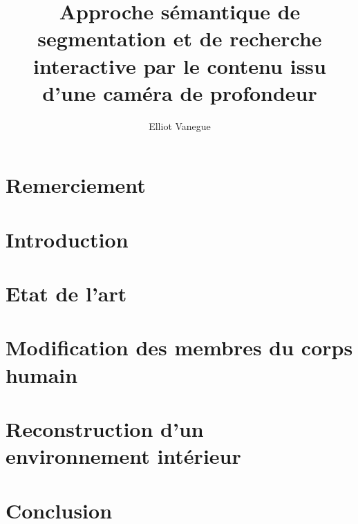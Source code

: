 \documentclass[a4paper,11pt]{article}
\title{Approche sémantique de segmentation et de recherche interactive par le contenu issu d’une caméra de profondeur}
\author{Elliot Vanegue}
\begin{document}
\maketitle
\newpage

\section*{Remerciement}
\newpage

\begin{abstract}
\end{abstract}
\newpage

\tableofcontents
\newpage

\section{Introduction}


\section{Etat de l'art}


\section{Modification des membres du corps humain}


\section{Reconstruction d'un environnement intérieur}



\section{Conclusion}


\newpage

\end{document}
